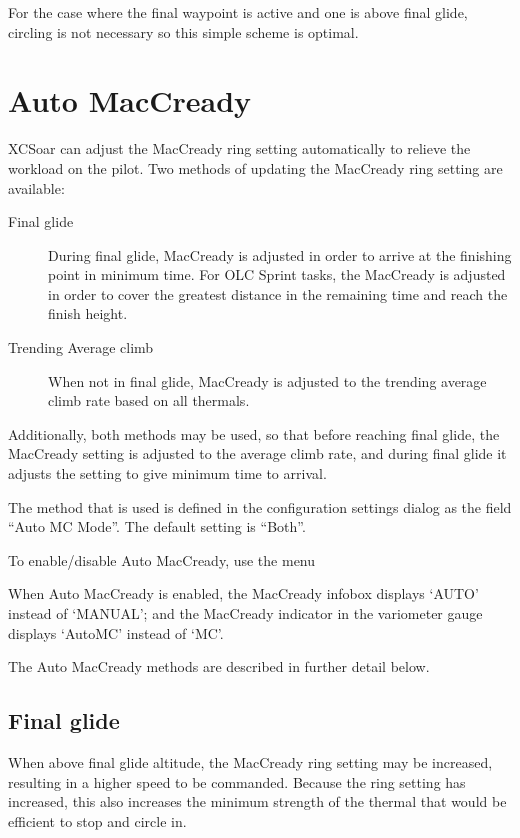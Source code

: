 For the case where the final waypoint is active and one is above final
glide, circling is not necessary so this simple scheme is optimal.

\section{Auto MacCready}\label{sec:auto-maccready}

XCSoar can adjust the MacCready ring setting automatically to relieve the
workload on the pilot.  Two methods of updating the MacCready ring setting
are available:
\begin{description}
\item[Final glide]  During final glide, MacCready is adjusted in order to
 arrive at the finishing point in minimum time.  For OLC Sprint tasks,
 the MacCready is adjusted in order to cover the greatest distance in the remaining
 time and reach the finish height.
\item[Trending Average climb] When not in final glide, MacCready is adjusted
to the trending average climb rate based on all thermals.
\end{description}
Additionally, both methods may be used, so that before reaching final glide,
the MacCready setting is adjusted to the average climb rate, and during final
glide it adjusts the setting to give minimum time to arrival.

The method that is used is defined in the configuration settings dialog as the
field ``Auto MC Mode''.  The default setting is ``Both''.

To enable/disable Auto MacCready, use the menu
\begin{quote}
\blink{}
\end{quote}

When Auto MacCready is enabled, the MacCready infobox displays `AUTO'
instead of `MANUAL'; and the MacCready indicator in the variometer
gauge displays `AutoMC' instead of `MC'.

The Auto MacCready methods are described in further detail below.

\subsection*{Final glide}
When above final glide altitude, the MacCready ring setting may be
increased, resulting in a higher speed to be commanded.  Because the
ring setting has increased, this also increases the minimum strength
of the thermal that would be efficient to stop and circle in.

